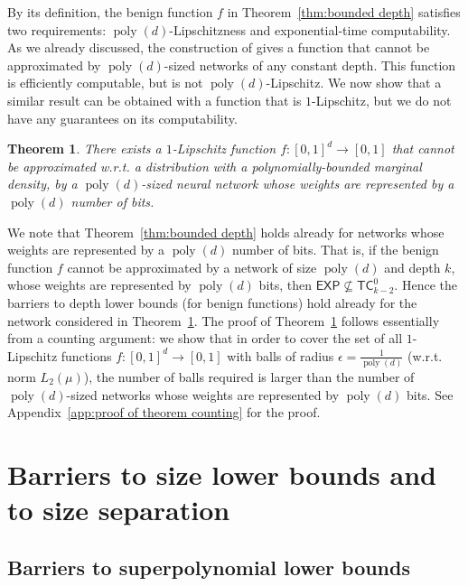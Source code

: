 \documentclass[11pt]{article}
\newtheorem{theorem}{Theorem}[section]
\DeclareMathOperator{\poly}{poly}
\newcommand{\TC}{\textsf{TC}}
\newcommand{\EXP}{\textsf{EXP}}
\begin{document}
By its definition, the benign function $f$ in Theorem~\ref{thm:bounded depth} satisfies two requirements: $\poly(d)$-Lipschitzness and exponential-time computability.
As we already discussed, the construction of \cite{telgarsky2016benefits} gives a function that cannot be approximated by $\poly(d)$-sized networks of any constant depth. This function is efficiently computable, but is not $\poly(d)$-Lipschitz.
We now show that a similar result can be obtained with a function that is $1$-Lipschitz, but we do not have any guarantees on its computability.

\begin{theorem}
\label{thm:counting}
	There exists a $1$-Lipschitz function $f:[0,1]^d \rightarrow [0,1]$ that cannot be approximated w.r.t. a distribution with a polynomially-bounded marginal density, by a $\poly(d)$-sized neural network whose weights are represented by a $\poly(d)$ number of bits.
\end{theorem}

We note that Theorem~\ref{thm:bounded depth} holds already for networks whose weights are represented by a $\poly(d)$ number of bits. That is, if the benign function $f$ cannot be approximated by a network of size $\poly(d)$ and depth $k$, whose weights are represented by $\poly(d)$ bits, then $\EXP \not \subseteq \TC^0_{k-2}$. Hence the barriers to depth lower bounds (for benign functions) hold already for the network considered in Theorem~\ref{thm:counting}.
The proof of Theorem~\ref{thm:counting} follows essentially from a counting argument: we show that in order to cover the set of all $1$-Lipschitz functions $f:[0,1]^d \rightarrow [0,1]$ with balls of radius $\epsilon=\frac{1}{\poly(d)}$ (w.r.t. norm $L_2(\mu)$), the number of balls required is larger than the number of $\poly(d)$-sized networks whose weights are represented by $\poly(d)$ bits. See Appendix~\ref{app:proof of theorem counting} for the proof.


\section{Barriers to size lower bounds and to size separation}
\label{sec:barriers size}

\subsection{Barriers to superpolynomial lower bounds}
\end{document}
